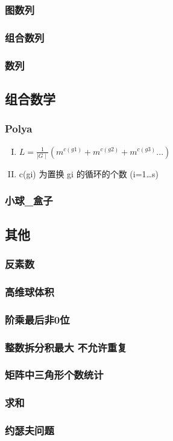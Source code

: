 \subsubsection{图数列}

\subsubsection{组合数列}

\subsubsection{数列}


\subsection{组合数学}
\subsubsection{Polya}
\begin{enumerate}[I. ]
    \item $ L = \frac {1}{\mid G \mid}(m^{c(g1)}+m^{c(g2)}+m^{c(g3)}...) $
    \item c(gi) 为置换 gi 的循环的个数 (i=1…s)
\end{enumerate}

\subsubsection{小球\_盒子}


\subsection{其他}
\subsubsection{反素数}

\subsubsection{高维球体积}

\subsubsection{阶乘最后非0位}

\subsubsection{整数拆分积最大 不允许重复}

\subsubsection{矩阵中三角形个数统计}

\subsubsection{求和}

\subsubsection{约瑟夫问题}





